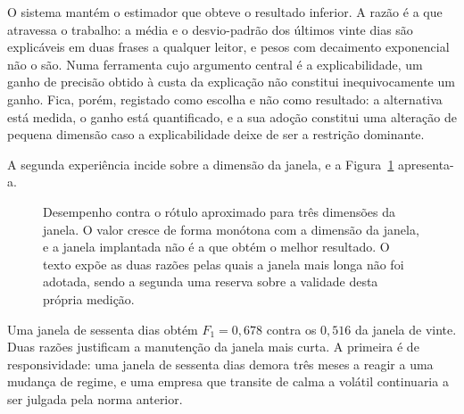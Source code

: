 O sistema mantém o estimador que obteve o resultado inferior. A razão é a que atravessa o trabalho:
a média e o desvio-padrão dos últimos vinte dias são explicáveis em duas frases a qualquer leitor, e
pesos com decaimento exponencial não o são. Numa ferramenta cujo argumento central é a
explicabilidade, um ganho de precisão obtido à custa da explicação não constitui inequivocamente um
ganho. Fica, porém, registado como escolha e não como resultado: a alternativa está medida, o ganho
está quantificado, e a sua adoção constitui uma alteração de pequena dimensão caso a explicabilidade
deixe de ser a restrição dominante.

A segunda experiência incide sobre a dimensão da janela, e a Figura~\ref{fig:av_janela} apresenta-a.

\begin{figure}[ht]
\centering
{}
\caption[Ablação à dimensão da janela]{Desempenho contra o rótulo aproximado para três dimensões da
janela. O valor cresce de forma monótona com a dimensão da janela, e a janela implantada não é a que
obtém o melhor resultado. O texto expõe as duas razões pelas quais a janela mais longa não foi
adotada, sendo a segunda uma reserva sobre a validade desta própria medição.}
\label{fig:av_janela}
\end{figure}

Uma janela de sessenta dias obtém $F_1 = 0{,}678$ contra os $0{,}516$ da janela de vinte. Duas razões
justificam a manutenção da janela mais curta. A primeira é de responsividade: uma janela de sessenta
dias demora três meses a reagir a uma mudança de regime, e uma empresa que transite de calma a
volátil continuaria a ser julgada pela norma anterior.


